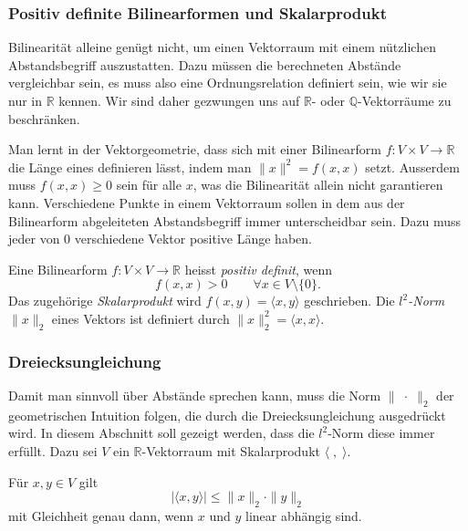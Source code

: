 \subsubsection{Positiv definite Bilinearformen und Skalarprodukt}
Bilinearität alleine genügt nicht, um einen Vektorraum mit einem
nützlichen Abstandsbegriff auszustatten.
Dazu müssen die berechneten Abstände vergleichbar sein, es muss also
eine Ordnungsrelation definiert sein, wie wir sie nur in $\mathbb{R}$
kennen.
Wir sind daher gezwungen uns auf $\mathbb{R}$- oder
$\mathbb{Q}$-Vektorräume zu beschränken.

Man lernt in der Vektorgeometrie, dass sich mit einer Bilinearform
$f\colon V\times V\to\mathbb{R}$ 
die Länge eines definieren lässt, indem man $\|x\|^2 = f(x,x)$
setzt.
Ausserdem muss $f(x,x)\ge 0$ sein für alle $x$, was die Bilinearität
allein nicht garantieren kann.
Verschiedene Punkte in einem Vektorraum sollen in dem aus der Bilinearform
abgeleiteten Abstandsbegriff immer unterscheidbar sein.
Dazu muss jeder von $0$ verschiedene Vektor positive Länge haben.

\begin{definition}
Eine Bilinearform $f\colon V\times V\to\mathbb{R}$
heisst {\em positiv definit}, wenn
%
\[
f(x,x) > 0\qquad\forall x\in V\setminus\{0\}.
\]
Das zugehörige {\em Skalarprodukt} wird $f(x,y)=\langle x,y\rangle$
geschrieben.
%
Die {\em $l^2$-Norm} $\|x\|_2$ eines Vektors ist definiert durch
$\|x\|_2^2 = \langle x,x\rangle$.
\end{definition}

\subsubsection{Dreiecksungleichung}
Damit man sinnvoll über Abstände sprechen kann, muss die Norm
$\|\;\cdot\;\|_2$ der geometrischen Intuition folgen, die durch
die Dreiecksungleichung ausgedrückt wird.
In diesem Abschnitt soll gezeigt werden, dass die $l^2$-Norm
diese immer erfüllt.
Dazu sei $V$ ein $\mathbb{R}$-Vektorraum mit Skalarprodukt
$\langle\;,\;\rangle$.

\begin{satz}
Für $x,y\in V$ gilt
\[
|\langle x,y\rangle |
\le
\| x\|_2\cdot \|y\|_2
\]
mit Gleichheit genau dann, wenn $x$ und $y$ linear abhängig sind.
\end{satz}

